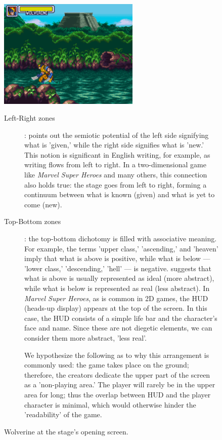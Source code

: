 \documentclass[english]{textolivre}
\begin{document}
\begin{figure}[htbp]
\begin{minipage}[t]{\textwidth}
\centering
\includegraphics[width=0.6\textwidth]{fig-013.png}
\caption{Wolverine at the stage’s opening screen.}
\label{fig13}
\end{minipage}
\begin{minipage}[t]{\textwidth}
\small
\begin{description}
    \item[Left-Right zones]: \textcite[p. 201-2]{van_leeuwen_introducing_2005} points out the semiotic potential of the left side signifying what is 'given,' while the right side signifies what is 'new.' This notion is significant in English writing, for example, as writing flows from left to right. In a two-dimensional game like \textit{Marvel Super Heroes} and many others, this connection also holds true: the stage goes from left to right, forming a continuum between what is known (given) and what is yet to come (new).

    \item[Top-Bottom zones]: the top-bottom dichotomy is filled with associative meaning. For example, the terms 'upper class,' 'ascending,' and 'heaven' imply that what is above is positive, while what is below — 'lower class,' 'descending,' 'hell' — is negative. \textcite[p. 204-5]{van_leeuwen_introducing_2005} suggests that what is above is usually represented as ideal (more abstract), while what is below is represented as real (less abstract). In \textit{Marvel Super Heroes}, as is common in 2D games, the HUD (heads-up display) appears at the top of the screen. In this case, the HUD consists of a simple life bar and the character's face and name. Since these are not diegetic elements, we can consider them more abstract, 'less real'.

    We hypothesize the following as to why this arrangement is commonly used: the game takes place on the ground; therefore, the creators dedicate the upper part of the screen as a 'non-playing area.' The player will rarely be in the upper area for long; thus the overlap between HUD and the player character is minimal, which would otherwise hinder the 'readability' of the game.


\end{description}
\end{minipage}
\end{figure}
\end{document}
